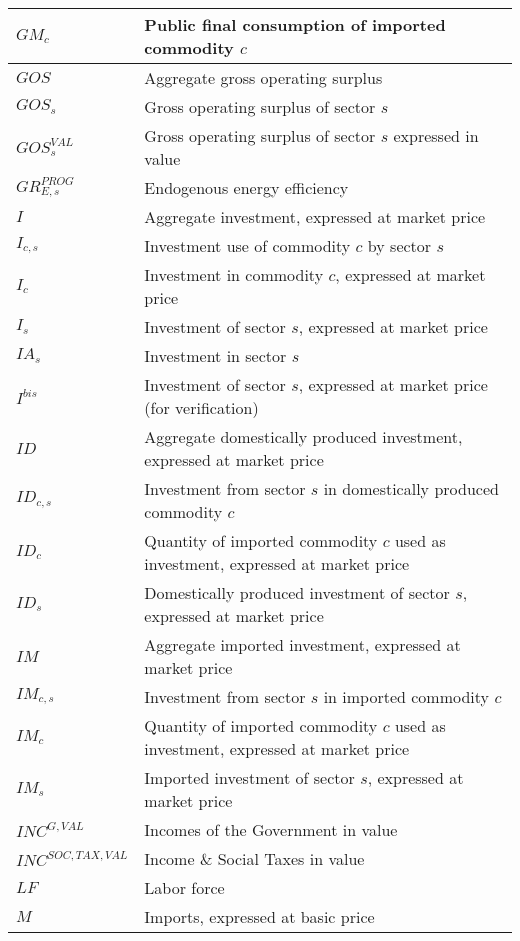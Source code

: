 \documentclass[12pt]{article}
\numberwithin{equation}{section}
\begin{document}
\begin{longtable}{@{}p{4cm}p{9cm}@{}}
 \midrule 
$GM_{c}$ & Public final consumption of imported commodity $c$ \\
 \midrule 
$GOS$ & Aggregate gross operating surplus \\
 \midrule 
$GOS_{s}$ & Gross operating surplus of sector $s$ \\
 \midrule 
$GOS^{VAL}_{s}$ & Gross operating surplus of sector $s$ expressed in value \\
 \midrule 
$GR^{PROG}_{E, s}$ & Endogenous energy efficiency \\
 \midrule 
$I$ & Aggregate investment, expressed at market price \\
 \midrule 
$I_{c, s}$ & Investment use of commodity $c$ by sector $s$ \\
 \midrule 
$I_{c}$ & Investment in commodity $c$, expressed at market price \\
 \midrule 
$I_{s}$ & Investment of sector $s$, expressed at market price \\
 \midrule 
$IA_{s}$ & Investment in sector $s$ \\
 \midrule 
$I^{bis}$ & Investment of sector $s$, expressed at market price (for verification) \\
 \midrule 
$ID$ & Aggregate domestically produced investment, expressed at market price \\
 \midrule 
$ID_{c, s}$ & Investment from sector $s$ in domestically produced commodity $c$ \\
 \midrule 
$ID_{c}$ & Quantity of imported commodity $c$ used as investment, expressed at market price \\
 \midrule 
$ID_{s}$ & Domestically produced investment of sector $s$, expressed at market price \\
 \midrule 
$IM$ & Aggregate imported investment, expressed at market price \\
 \midrule 
$IM_{c, s}$ & Investment from sector $s$ in imported commodity $c$ \\
 \midrule 
$IM_{c}$ & Quantity of imported commodity $c$ used as investment, expressed at market price \\
 \midrule 
$IM_{s}$ & Imported investment of sector $s$, expressed at market price \\
 \midrule 
$INC^{G,VAL}$ & Incomes of the Government in value \\
 \midrule 
$INC^{SOC,TAX,VAL}$ & Income \& Social Taxes in value \\
 \midrule 
$LF$ & Labor force \\
 \midrule 
$M$ & Imports, expressed at basic price \\

\end{longtable}
\end{document}
